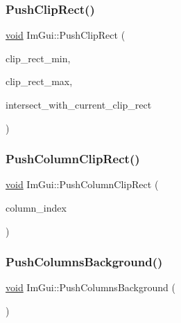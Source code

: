 \mbox{\label{namespaceImGui_a11c8bd8676e1281e15b24c9615b6904a}} 
\subsubsection{\texorpdfstring{Push\+Clip\+Rect()}{PushClipRect()}}
{\footnotesize\ttfamily \hyperlink{imgui__impl__opengl3__loader_8h_ac668e7cffd9e2e9cfee428b9b2f34fa7}{void} Im\+Gui\+::\+Push\+Clip\+Rect (\begin{DoxyParamCaption}\item[{const \hyperlink{structImVec2}{Im\+Vec2} \&}]{clip\+\_\+rect\+\_\+min,  }\item[{const \hyperlink{structImVec2}{Im\+Vec2} \&}]{clip\+\_\+rect\+\_\+max,  }\item[{bool}]{intersect\+\_\+with\+\_\+current\+\_\+clip\+\_\+rect }\end{DoxyParamCaption})}

\mbox{\label{namespaceImGui_a54b5cf7f40d092e2959b1df2c8118181}} 
\subsubsection{\texorpdfstring{Push\+Column\+Clip\+Rect()}{PushColumnClipRect()}}
{\footnotesize\ttfamily \hyperlink{imgui__impl__opengl3__loader_8h_ac668e7cffd9e2e9cfee428b9b2f34fa7}{void} Im\+Gui\+::\+Push\+Column\+Clip\+Rect (\begin{DoxyParamCaption}\item[{int}]{column\+\_\+index }\end{DoxyParamCaption})}

\mbox{\label{namespaceImGui_a39f557bf00d94069a41b0d40bd72c522}} 
\subsubsection{\texorpdfstring{Push\+Columns\+Background()}{PushColumnsBackground()}}
{\footnotesize\ttfamily \hyperlink{imgui__impl__opengl3__loader_8h_ac668e7cffd9e2e9cfee428b9b2f34fa7}{void} Im\+Gui\+::\+Push\+Columns\+Background (\begin{DoxyParamCaption}{ }\end{DoxyParamCaption})}

